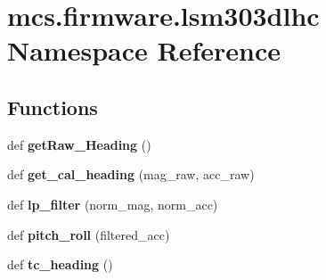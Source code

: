 \hypertarget{namespacemcs_1_1firmware_1_1lsm303dlhc}{}\section{mcs.\+firmware.\+lsm303dlhc Namespace Reference}
\label{namespacemcs_1_1firmware_1_1lsm303dlhc}
\subsection*{Functions}
\begin{DoxyCompactItemize}
\item 
\mbox{\label{namespacemcs_1_1firmware_1_1lsm303dlhc_a1dd0dda685906d682fdc61b928daea0a}} 
def {\bfseries get\+Raw\+\_\+\+Heading} ()
\item 
\mbox{\label{namespacemcs_1_1firmware_1_1lsm303dlhc_a3231badac60b0e0fb6c36cba62157075}} 
def {\bfseries get\+\_\+cal\+\_\+heading} (mag\+\_\+raw, acc\+\_\+raw)
\item 
\mbox{\label{namespacemcs_1_1firmware_1_1lsm303dlhc_aef240f31c29e78cbd547a16b0fa22898}} 
def {\bfseries lp\+\_\+filter} (norm\+\_\+mag, norm\+\_\+acc)
\item 
\mbox{\label{namespacemcs_1_1firmware_1_1lsm303dlhc_ac63154e3c70fcbefcc0e16060fac99a8}} 
def {\bfseries pitch\+\_\+roll} (filtered\+\_\+acc)
\item 
\mbox{\label{namespacemcs_1_1firmware_1_1lsm303dlhc_a626e3ce5e3a1602aa244be13e4b25f9b}} 
def {\bfseries tc\+\_\+heading} ()
\end{DoxyCompactItemize}
